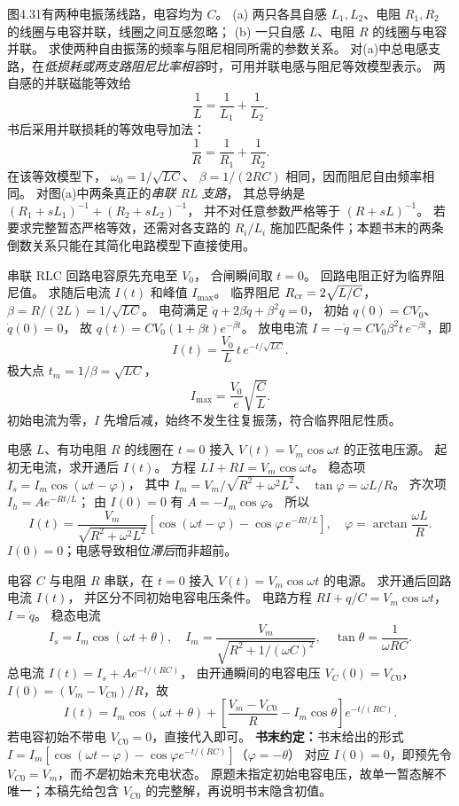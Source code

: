 图4.31有两种电振荡线路，电容均为 $C$。
(a) 两只各具自感 $L_1,L_2$、电阻 $R_1,R_2$ 的线圈与电容并联，线圈之间互感忽略；
(b) 一只自感 $L$、电阻 $R$ 的线圈与电容并联。
求使两种自由振荡的频率与阻尼相同所需的参数关系。
\exsolution
对(a)中总电感支路，在\emph{低损耗或两支路阻尼比率相容}时，可用并联电感与阻尼等效模型表示。
两自感的并联磁能等效给
\[
\boxed{\frac1L=\frac1{L_1}+\frac1{L_2}}.
\]
书后采用并联损耗的等效电导加法：
\[
\boxed{\frac1R=\frac1{R_1}+\frac1{R_2}}.
\]
在该等效模型下，
$\omega_0=1/\sqrt{LC}$、
$\beta=1/(2RC)$ 相同，因而阻尼自由频率相同。
\excheck 对图(a)中两条真正的\emph{串联 RL 支路}，
其总导纳是
$(R_1+sL_1)^{-1}+(R_2+sL_2)^{-1}$，
并不对任意参数严格等于
$(R+sL)^{-1}$。
若要求完整暂态严格等效，还需对各支路的 $R_i/L_i$ 施加匹配条件；本题书末的两条倒数关系只能在其简化电路模型下直接使用。

串联 RLC 回路电容原先充电至 $V_0$，
合闸瞬间取 $t=0$。
回路电阻正好为临界阻尼值。
求随后电流 $I(t)$ 和峰值 $I_{\max}$。
\exsolution
临界阻尼
$R_{\rm cr}=2\sqrt{L/C}$，
$\beta=R/(2L)=1/\sqrt{LC}$。
电荷满足
$\ddot q+2\beta\dot q+\beta^2q=0$，
初始 $q(0)=CV_0$、$\dot q(0)=0$，
故
$q(t)=CV_0(1+\beta t)e^{-\beta t}$。
放电电流
$I=-\dot q=CV_0\beta^2 t\,e^{-\beta t}$，即
\[
\boxed{I(t)=\frac{V_0}{L}\,t\,
e^{-t/\sqrt{LC}}}.
\]
极大点 $t_m=1/\beta=\sqrt{LC}$，
\[
\boxed{I_{\max}=\frac{V_0}{e}\sqrt{\frac CL}}.
\]
\excheck 初始电流为零，$I$ 先增后减，始终不发生往复振荡，符合临界阻尼性质。

电感 $L$、有功电阻 $R$ 的线圈在 $t=0$ 接入
$V(t)=V_m\cos\omega t$ 的正弦电压源。
起初无电流，求开通后 $I(t)$。
\exsolution
方程
$L\dot I+RI=V_m\cos\omega t$。
稳态项
$I_s=I_m\cos(\omega t-\varphi)$，
其中
$I_m=V_m/\sqrt{R^2+\omega^2L^2}$、
$\tan\varphi=\omega L/R$。
齐次项 $I_h=Ae^{-Rt/L}$；
由 $I(0)=0$ 有
$A=-I_m\cos\varphi$。
所以
\[
\boxed{I(t)=\frac{V_m}{\sqrt{R^2+\omega^2L^2}}
\left[\cos(\omega t-\varphi)
-\cos\varphi\,e^{-Rt/L}\right]},
\quad
\varphi=\arctan\frac{\omega L}{R}.
\]
\excheck $I(0)=0$；电感导致相位\emph{滞后}而非超前。

电容 $C$ 与电阻 $R$ 串联，在 $t=0$ 接入
$V(t)=V_m\cos\omega t$ 的电源。
求开通后回路电流 $I(t)$，
并区分不同初始电容电压条件。
\exsolution
电路方程
$RI+q/C=V_m\cos\omega t$，
$I=\dot q$。
稳态电流
\[
I_s=I_m\cos(\omega t+\theta),\quad
I_m=\frac{V_m}{\sqrt{R^2+1/(\omega C)^2}},
\quad
\tan\theta=\frac1{\omega RC}.
\]
总电流
$I(t)=I_s+A e^{-t/(RC)}$，
由开通瞬间的电容电压 $V_C(0)=V_{C0}$，
$I(0)=(V_m-V_{C0})/R$，故
\[
\boxed{I(t)=I_m\cos(\omega t+\theta)
+\left[\frac{V_m-V_{C0}}R-I_m\cos\theta\right]
e^{-t/(RC)}}.
\]
若电容初始不带电 $V_{C0}=0$，直接代入即可。
\textbf{书末约定：}书末给出的形式
$I=I_m[\cos(\omega t-\varphi)-
\cos\varphi e^{-t/(RC)}]$（$\varphi=-\theta$）
对应 $I(0)=0$，即预先令
$V_{C0}=V_m$，而\emph{不是}初始未充电状态。
\excheck 原题未指定初始电容电压，故单一暂态解不唯一；本稿先给包含 $V_{C0}$ 的完整解，再说明书末隐含初值。

